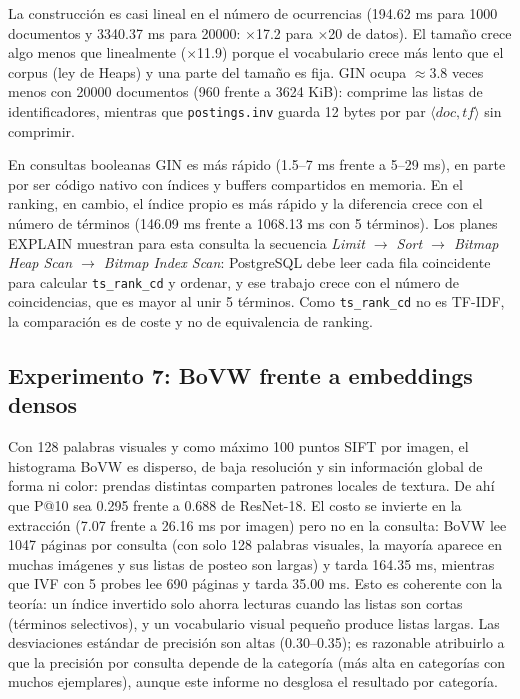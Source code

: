 \documentclass[11pt,a4paper]{article}
\newcommand{\code}[1]{\texttt{#1}}
\begin{document}
La construcción es casi lineal en el número de ocurrencias (194.62 ms para 1000 documentos y 3340.37 ms para 20000: $\times$17.2 para $\times$20 de datos). El tamaño crece algo menos que linealmente ($\times$11.9) porque el vocabulario crece más lento que el corpus (ley de Heaps) y una parte del tamaño es fija. GIN ocupa $\approx$3.8 veces menos con 20000 documentos (960 frente a 3624 KiB): comprime las listas de identificadores, mientras que \code{postings.inv} guarda 12 bytes por par $\langle doc,tf\rangle$ sin comprimir.

En consultas booleanas GIN es más rápido (1.5--7 ms frente a 5--29 ms), en parte por ser código nativo con índices y buffers compartidos en memoria. En el ranking, en cambio, el índice propio es más rápido y la diferencia crece con el número de términos (146.09 ms frente a 1068.13 ms con 5 términos). Los planes EXPLAIN muestran para esta consulta la secuencia \emph{Limit $\rightarrow$ Sort $\rightarrow$ Bitmap Heap Scan $\rightarrow$ Bitmap Index Scan}: PostgreSQL debe leer cada fila coincidente para calcular \code{ts\_rank\_cd} y ordenar, y ese trabajo crece con el número de coincidencias, que es mayor al unir 5 términos. Como \code{ts\_rank\_cd} no es TF-IDF, la comparación es de coste y no de equivalencia de ranking.

\subsection{Experimento 7: BoVW frente a embeddings densos}
Con 128 palabras visuales y como máximo 100 puntos SIFT por imagen, el histograma BoVW es disperso, de baja resolución y sin información global de forma ni color: prendas distintas comparten patrones locales de textura. De ahí que P@10 sea 0.295 frente a 0.688 de ResNet-18. El costo se invierte en la extracción (7.07 frente a 26.16 ms por imagen) pero no en la consulta: BoVW lee 1047 páginas por consulta (con solo 128 palabras visuales, la mayoría aparece en muchas imágenes y sus listas de posteo son largas) y tarda 164.35 ms, mientras que IVF con 5 probes lee 690 páginas y tarda 35.00 ms. Esto es coherente con la teoría: un índice invertido solo ahorra lecturas cuando las listas son cortas (términos selectivos), y un vocabulario visual pequeño produce listas largas. Las desviaciones estándar de precisión son altas (0.30--0.35); es razonable atribuirlo a que la precisión por consulta depende de la categoría (más alta en categorías con muchos ejemplares), aunque este informe no desglosa el resultado por categoría.
\end{document}
